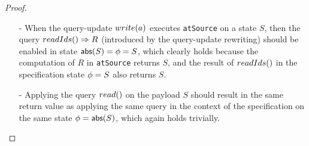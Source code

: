 \begin {proof}
\begin{itemize}
\begin{itemize}
    Let us prove $S' = \abstate'$ by contradiction.

        \begin{itemize}
        \setlength{\itemsep}{0.5pt}
        \item[-] If there exists item $(c,V'')$ in $\abstate'$ but not in $S'$: we can see that $(c,V'') \in S$, $(c,V'') \notin S_1$, and $(c,V'') \in S_2$.

        Since $(c,V'') \notin S_1$, we know that there exists a $write$ operation $\alabel$, such that $(\alabelshort[{\tt write}]{c,V''},\alabel)$, $(\alabel,\alabelshort[{\tt write}]{a,V'}) \in \avisord$. Since $(c,V'') \in S$, we can see that the downstream $\alabel$ is not applied yet in the replica of $S$, and also the downstream $\alabel$ is not applied yet in the replica of $S'$, while in $S'$, the downstream of $\alabelshort[{\tt write}]{a,V'}$ is applied. Since $(\alabel,\alabelshort[{\tt write}]{a,V'}) \in \avisord$, we can see that this violates the {} assumption.

        \item[-] If there exists item $(c,V'')$ in $S'$ but not in $\abstate'$: we can see that $(c,V'') \in S$, $(c,V'') \notin S_2$, and $(c,V'') \in S_1$.

        Since $(c,V'') \notin S_2$, we know that $\neg(V'' < V)$. Since $(c,V'') \in S_1$, we know that $(\alabelshort[{\tt write}]{c,V''},\alabelshort[{\tt write}]{a,V'}) \in \avisord$. This contradicts $fact1$ and $fact2$.
        \end{itemize}

    Therefore, we know that $S' = \abstate'$, and the case of $(a,V')$ and $write(a,V',S_1)$ holds.

    \item[-] When the query-update $\alabelshort[write]{a}$ executes {\tt atSource} on a state $S$, then the query $\alabellong[readIds]{}{R}{}$ (introduced by the query-update rewriting) should be enabled in state $\refmap(S)=\abstate = S$, which clearly holds because the computation of $R$ in {\tt atSource} returns $S$, and the result of $\alabelshort[readIds]{}$ in the specification state $\abstate = S$ also returns $S$.

    \item[-] Applying the query $\alabelshort[read]{}$ on the payload $S$ should result in the same return value as applying the same query in the context of the specification on the same state $\abstate = \refmap(S)$, which again holds trivially.
    \end{itemize}


\end{itemize}
\end{proof}
